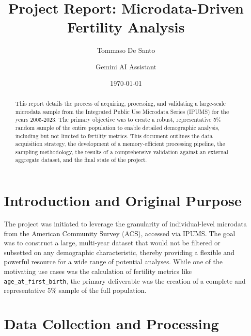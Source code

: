 \documentclass{article}
\title{Project Report: Microdata-Driven Fertility Analysis}
\author[1]{Tommaso De Santo}
\author[2]{Gemini AI Assistant}
\affil[1]{Primary Researcher}
\affil[2]{AI Programming Partner}
\date{\today}
\begin{document}
\maketitle

\begin{abstract}
This report details the process of acquiring, processing, and validating a large-scale microdata sample from the Integrated Public Use Microdata Series (IPUMS) for the years 2005-2023. The primary objective was to create a robust, representative 5\% random sample of the entire population to enable detailed demographic analysis, including but not limited to fertility metrics. This document outlines the data acquisition strategy, the development of a memory-efficient processing pipeline, the sampling methodology, the results of a comprehensive validation against an external aggregate dataset, and the final state of the project.
\end{abstract}

\section{Introduction and Original Purpose}

The project was initiated to leverage the granularity of individual-level microdata from the American Community Survey (ACS), accessed via IPUMS. The goal was to construct a large, multi-year dataset that would not be filtered or subsetted on any demographic characteristic, thereby providing a flexible and powerful resource for a wide range of potential analyses. While one of the motivating use cases was the calculation of fertility metrics like \texttt{age\_at\_first\_birth}, the primary deliverable was the creation of a complete and representative 5\% sample of the full population.

\section{Data Collection and Processing}
\end{document}
